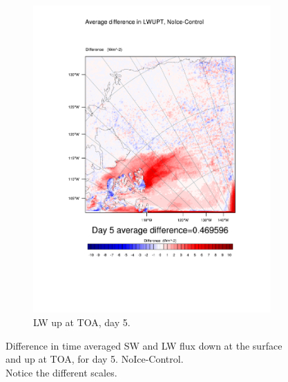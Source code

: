 \begin{figure}
\begin{subfigure}{0.48\textwidth}
		\includegraphics[width=\textwidth]{results/noice/diff_NoIce_LWUPT_Day5.pdf}
		\caption{LW up at TOA, day 5.}
		\label{subfig:lwup_r2Day5}
	\end{subfigure}
	\caption{Difference in time averaged SW and LW flux down at the surface and up at TOA, for day 5. NoIce-Control.\\Notice the different scales.}
	\label{fig:radiation_r2Day5}
\end{figure}

